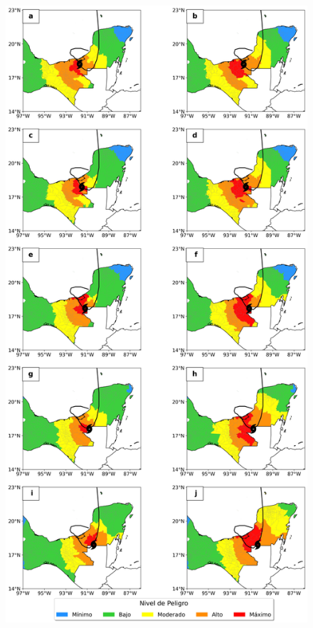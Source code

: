 \begin{frame}
\begin{columns}
\begin{column}{0.5\textwidth}
\begin{figure}
        \includegraphics[scale = 0.135]{Images/Figures/Fig_4_1.jpeg}
        \label{fig:my_label}
    \end{figure}
    \end{column}
\end{columns}
\end{frame}

